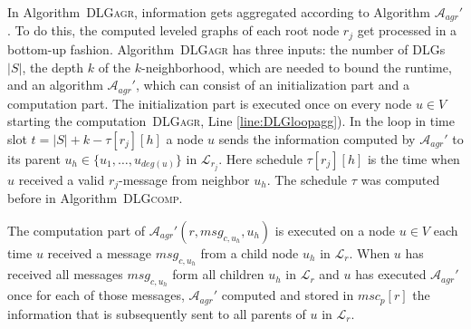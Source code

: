 \documentclass[11pt]{article}
\newcommand{\calL}{\mathcal{L}}
\newif\iffull
\begin{document}
In  Algorithm\iffull~\ref{alg:DLGagr}\fi~\textsc{DLGagr}, information gets aggregated according to Algorithm $\mathcal{A}_{agr}'$. To do this, the computed leveled graphs of each root node $r_j$ get processed in a bottom-up fashion. 
Algorithm\iffull~\ref{alg:DLGagr}\fi~\textsc{DLGagr} has three inputs: the number of DLGs $|S|$, the depth $k$ of the $k$-neighborhood, which are needed to bound the runtime, and an algorithm $\mathcal{A}_{agr}'$, which can consist of an initialization part and a computation part. The initialization part is executed once on every node $u\in V$ starting the computation\iffull(loop of Algorithm\iffull~\ref{alg:DLGagr}\fi~\textsc{DLGagr}, Line \ref{line:DLGloopagg})\fi. In the loop in time slot $t=|S|+k-\tau[r_j][h]$ a node $u$ sends the information computed by $\mathcal{A}_{agr}'$ to its parent $u_h\in \{u_1,\dots,u_{deg(u)}\}$ in $\calL_{r_j}$. Here schedule $\tau[r_j][h]$ is the time when $u$ received a valid $r_j$-message from neighbor $u_h$. The schedule $\tau$ was computed before in Algorithm\iffull~\ref{alg:DLGcomp}\fi~\textsc{DLGcomp}\iffull (Line \ref{line:tau})\fi. 

The computation part of $\mathcal{A}_{agr}'(r,msg_{c,u_h},u_h)$ is executed on a node $u\in V$ each time $u$ received a message $msg_{c,u_h}$ from a child node $u_h$ in $\calL_r$. When $u$ has received all messages $msg_{c,u_h}$ form all children $u_h$ in $\calL_r$ and $u$ has executed $\mathcal{A}_{agr}'$ once for each of those messages, $\mathcal{A}_{agr}'$ computed and stored in $msc_p[r]$ the information that is subsequently sent to all parents of $u$ in $\calL_r$.
\end{document}
